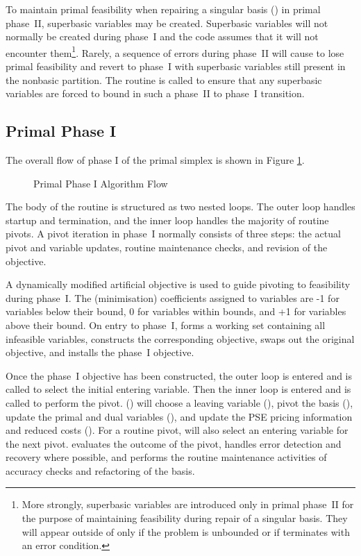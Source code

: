 To maintain primal feasibility when repairing a singular basis
()
in primal phase~II, superbasic variables may be created.
Superbasic variables will not normally be created during phase~I and the
code assumes that it will not encounter them\footnote{%
More strongly, superbasic variables are introduced only in primal phase~II for
the purpose of maintaining feasibility during repair of a singular basis.
They will appear outside of  only if the problem is unbounded
or if  terminates with an error condition.}.
Rarely, a sequence of errors during phase~II will cause \dylp to lose
primal feasibility and revert to phase~I with superbasic variables still
present in the nonbasic partition.
The routine  is called to ensure that any superbasic
variables are forced to bound in such a phase~II to phase~I transition.

\subsection{Primal Phase I}
\label{sec:PrimalPhaseI}

The overall flow of phase I of the primal simplex is shown in Figure
\ref{fig:PrimalPhaseIFlow}.
\begin{figure}[htbp]
\centering
{}
\caption{Primal Phase I Algorithm Flow} \label{fig:PrimalPhaseIFlow}
\end{figure}
The body of the routine is structured as two nested loops.
The outer loop handles startup and termination, and the inner loop handles the
majority of routine pivots.
A pivot iteration in phase~I normally consists of three steps: the actual
pivot and variable updates, routine maintenance checks, and revision of
the objective.

A dynamically modified artificial objective is used to guide
pivoting to feasibility during phase~I\@.
The (minimisation) coefficients assigned to variables are
-1 for variables below their bound, 0 for variables within bounds, and +1 for
variables above their bound.
On entry to phase~I,  forms a working set containing
all infeasible variables, constructs the corresponding objective, swaps out
the original objective, and installs the phase~I objective.

Once the phase~I objective has been constructed, the outer loop is entered and
 is called to select the initial entering variable.
Then the inner loop is entered and  is called to
perform the pivot.
 (\vid {}) will choose a
leaving variable (), pivot the basis (),
update the primal and dual variables (),
and update the PSE pricing information and reduced costs ().
For a routine pivot,  will also select an entering variable
for the next pivot.
 evaluates the outcome of the pivot, handles error detection
and recovery where possible, and performs the routine maintenance activities
of accuracy checks and refactoring of the basis.

